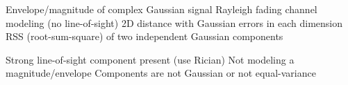 
\PSyes{} Envelope/magnitude of complex Gaussian signal\PSbr{}\PSyes{} Rayleigh fading channel modeling (no line-of-sight)\PSbr{}\PSyes{} 2D distance with Gaussian errors in each dimension\PSbr{}\PSyes{} RSS (root-sum-square) of two independent Gaussian components


\PSno{} Strong line-of-sight component present (use Rician)\PSbr{}\PSno{} Not modeling a magnitude/envelope\PSbr{}\PSno{} Components are not Gaussian or not equal-variance



\begin{Shaded}
\begin{Highlighting}[]
 \OperatorTok{=} \OperatorTok{;}   
 \OperatorTok{=} \NormalTok{(}\OperatorTok{,} \OperatorTok{,} \NormalTok{)}\OperatorTok{;}

 \OperatorTok{=} \NormalTok{(}\OperatorTok{,} \NormalTok{)}\OperatorTok{;}
 \OperatorTok{=} \NormalTok{(}\OperatorTok{,} \NormalTok{)}\OperatorTok{;}

\OperatorTok{;}
\NormalTok{(}\OperatorTok{,}\OperatorTok{,}\NormalTok{)}\OperatorTok{;}
\NormalTok{(}\OperatorTok{,} \OperatorTok{,} \OperatorTok{,} \OperatorTok{,} \NormalTok{)}\OperatorTok{;}
\NormalTok{(}\NormalTok{)}\OperatorTok{;} \NormalTok{(}\NormalTok{)}\OperatorTok{;}
\NormalTok{(}\NormalTok{(}\OperatorTok{,} \NormalTok{))}\OperatorTok{;}
 \OperatorTok{;}


\end{Highlighting}
\end{Shaded}
